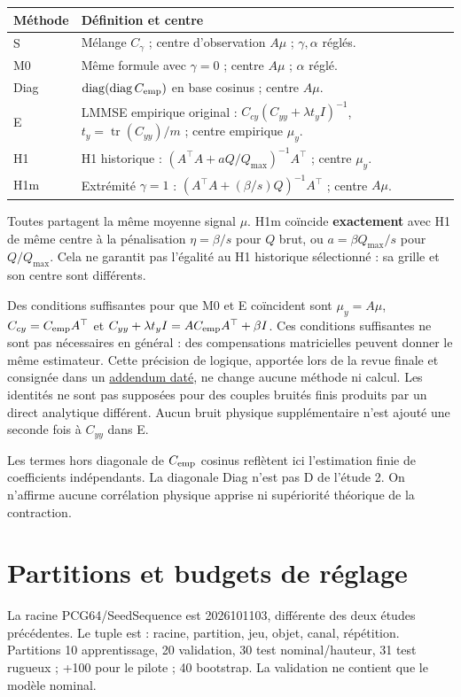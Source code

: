 \documentclass[11pt,a4paper]{article}
\newcommand{\src}[2]{\href{\DataURL{#1}}{#2}}
\begin{document}
\begin{center}\small
\begin{tabular}{lp{10.9cm}}
\toprule Méthode & Définition et centre\\\midrule
S & Mélange $C_\gamma$ ; centre d'observation $A\mu$ ; $\gamma,\alpha$ réglés.\\
M0 & Même formule avec $\gamma=0$ ; centre $A\mu$ ; $\alpha$ réglé.\\
Diag & $\operatorname{diag}(\operatorname{diag}C_{\rm emp})$ en base cosinus ; centre $A\mu$.\\
E & LMMSE empirique original : $C_{cy}(C_{yy}+\lambda t_yI)^{-1}$, $t_y=\operatorname{tr}(C_{yy})/m$ ; centre empirique $\mu_y$.\\
H1 & H1 historique : $(A^\top A+aQ/Q_{\max})^{-1}A^\top$ ; centre $\mu_y$.\\
H1m & Extrémité $\gamma=1$ : $(A^\top A+(\beta/s)Q)^{-1}A^\top$ ; centre $A\mu$.\\\bottomrule
\end{tabular}\end{center}

Toutes partagent la même moyenne signal $\mu$. H1m coïncide \textbf{exactement} avec H1 de même centre à la pénalisation $\eta=\beta/s$ pour $Q$ brut, ou $a=\beta Q_{\max}/s$ pour $Q/Q_{\max}$. Cela ne garantit pas l'égalité au H1 historique sélectionné : sa grille et son centre sont différents.

Des conditions suffisantes pour que M0 et E coïncident sont $\mu_y=A\mu$, $C_{cy}=C_{\rm emp}A^\top$ et $C_{yy}+\lambda t_yI=AC_{\rm emp}A^\top+\beta I$. Ces conditions suffisantes ne sont pas nécessaires en général : des compensations matricielles peuvent donner le même estimateur. Cette précision de logique, apportée lors de la revue finale et consignée dans un \src{MATHEMATICS_ADDENDUM.md}{addendum daté}, ne change aucune méthode ni calcul. Les identités ne sont pas supposées pour des couples bruités finis produits par un direct analytique différent. Aucun bruit physique supplémentaire n'est ajouté une seconde fois à $C_{yy}$ dans E.

Les termes hors diagonale de $C_{\rm emp}$ cosinus reflètent ici l'estimation finie de coefficients indépendants. La diagonale Diag n'est pas D de l'étude 2. On n'affirme aucune corrélation physique apprise ni supériorité théorique de la contraction.

\newpage
\section{Partitions et budgets de réglage}
La racine PCG64/SeedSequence est 2026101103, différente des deux études précédentes. Le tuple est : racine, partition, jeu, objet, canal, répétition. Partitions 10 apprentissage, 20 validation, 30 test nominal/hauteur, 31 test rugueux ; +100 pour le pilote ; 40 bootstrap. La validation ne contient que le modèle nominal.
\end{document}
